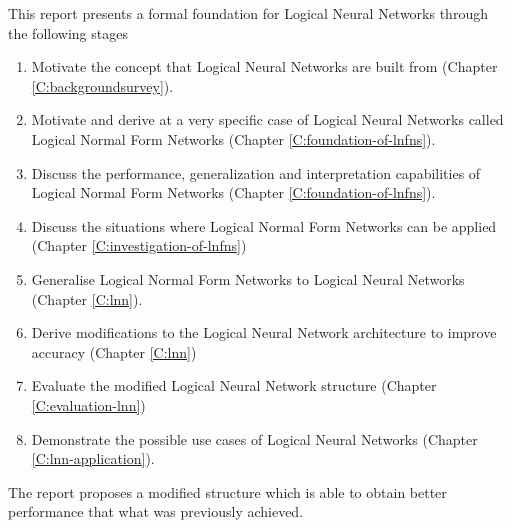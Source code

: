 This report presents a formal foundation for Logical Neural Networks through the following stages
\begin{enumerate}
	\item Motivate the concept that Logical Neural Networks are built from (Chapter \ref{C:backgroundsurvey}).
	\item Motivate and derive at a very specific case of Logical Neural Networks called Logical Normal Form Networks (Chapter \ref{C:foundation-of-lnfns}).
	\item Discuss the performance, generalization and interpretation capabilities of Logical Normal Form Networks (Chapter \ref{C:foundation-of-lnfns}).
	\item Discuss the situations where Logical Normal Form Networks can be applied (Chapter \ref{C:investigation-of-lnfns})
	\item Generalise Logical Normal Form Networks to Logical Neural Networks (Chapter \ref{C:lnn}).
	\item Derive modifications to the Logical Neural Network architecture to improve accuracy (Chapter \ref{C:lnn})
	\item Evaluate the modified Logical Neural Network structure (Chapter \ref{C:evaluation-lnn})
	\item Demonstrate the possible use cases of Logical Neural Networks (Chapter \ref{C:lnn-application}).
\end{enumerate}

 The report proposes a modified structure which is able to obtain better performance that what was previously achieved.